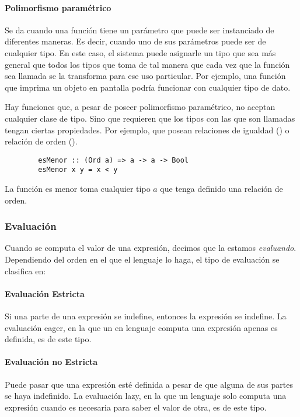 \paragraph{Polimorfismo paramétrico} Se da cuando una función tiene un parámetro que puede ser instanciado de diferentes maneras. Es decir, cuando uno de sus parámetros puede ser de cualquier tipo. En este caso, el sistema puede asignarle un tipo que sea más general que todos los tipos que toma de tal manera que cada vez que la función sea llamada se la transforma para ese uso particular. Por ejemplo, una función que imprima un objeto en pantalla podría funcionar con cualquier tipo de dato.

Hay funciones que, a pesar de poseer polimorfismo paramétrico, no aceptan cualquier clase de tipo. Sino que requieren que los tipos con las que son llamadas tengan ciertas propiedades. Por ejemplo, que posean relaciones de igualdad () o relación de orden ().

\begin{centrado}
	\begin{verbatim}
		esMenor :: (Ord a) => a -> a -> Bool 
		esMenor x y = x < y
	\end{verbatim}
\end{centrado} 

La función es menor toma cualquier tipo $a$ que tenga definido una relación de orden.

\subsubsection{Evaluación}
Cuando se computa el valor de una expresión, decimos que la estamos \textit{evaluando}. Dependiendo del orden en el que el lenguaje lo haga, el tipo de evaluación se  clasifica en:

\paragraph{Evaluación Estricta} Si una parte de una expresión se indefine, entonces la expresión se indefine. La evaluación eager, en la que un en lenguaje computa una expresión apenas es definida, es de este tipo. 

\paragraph{Evaluación no Estricta} Puede pasar que una expresión esté definida a pesar de que alguna de sus partes se haya indefinido. La evaluación lazy, en la que un lenguaje solo computa una expresión cuando es necesaria para saber el valor de otra, es de este tipo.

